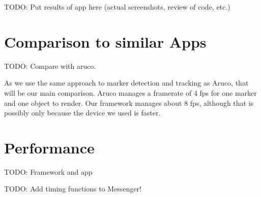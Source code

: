 TODO: Put results of app here (actual screenshots, review of code, etc.)

\section{Comparison to similar Apps}

TODO: Compare with aruco.

As we use the same approach to marker detection and tracking as Aruco, that will be our main comparison.
Aruco manages a framerate of 4 fps for one marker and one object to render.
Our framework manages about 8 fps, although that is possibly only because the device we used is faster.

\section{Performance}

TODO: Framework and app

TODO: Add timing functions to Messenger!
